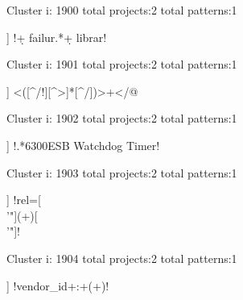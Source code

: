 Cluster i: 1900
total projects:2
total patterns:1
\begin{multicols}{1}
\begin{description}[noitemsep,topsep=0pt]
\item [[2] ] \cverb!\d+ failur.*\d+ librar!
\end{description}
\end{multicols}







Cluster i: 1901
total projects:2
total patterns:1
\begin{multicols}{1}
\begin{description}[noitemsep,topsep=0pt]
\item [[2] ] \cverb@<([^/!][^>]*[^/])>\s+</@
\end{description}
\end{multicols}







Cluster i: 1902
total projects:2
total patterns:1
\begin{multicols}{1}
\begin{description}[noitemsep,topsep=0pt]
\item [[2] ] \cverb!.*6300ESB Watchdog Timer!
\end{description}
\end{multicols}







Cluster i: 1903
total projects:2
total patterns:1
\begin{multicols}{1}
\begin{description}[noitemsep,topsep=0pt]
\item [[2] ] \cverb!rel=[\\'"](\w+)[\\'"]!
\end{description}
\end{multicols}







Cluster i: 1904
total projects:2
total patterns:1
\begin{multicols}{1}
\begin{description}[noitemsep,topsep=0pt]
\item [[2] ] \cverb!vendor_id\s+:\s+(\w+)!
\end{description}
\end{multicols}







